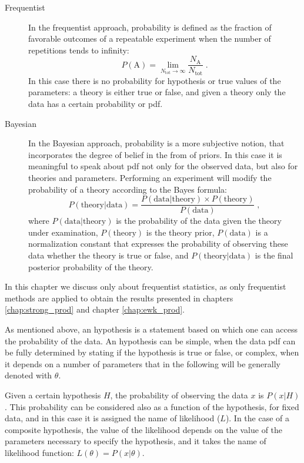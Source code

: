 \begin{description}
\item[Frequentist] In the frequentist approach, probability is defined as the fraction of favorable outcomes of a repeatable experiment when the number of repetitions tends to infinity:
\begin{equation}
P(\mathrm{A}) = \lim_{N_{\mathrm{tot}} \rightarrow \infty} \frac{N_\mathrm{A}}{N_{\mathrm{tot}}} \; .
\end{equation}
In this case there is no probability for hypothesis or true values of the parameters: a theory is either true or false, and given a theory only the data has a certain probability or \gls{pdf}.

\item[Bayesian] In the Bayesian approach, probability is a more subjective notion, that incorporates the degree of belief in the from of priors. In this case it is meaningful to speak about \gls{pdf} not only for the observed data, but also for theories and parameters. Performing an experiment will modify the probability of a theory according to the Bayes formula:
\begin{equation}
P(\mathrm{theory} | \mathrm{data}) = \frac{ P(\mathrm{data}|\mathrm{theory}) \times P(\mathrm{theory})}{P(\mathrm{data})} \; ,
\end{equation}
where $P(\mathrm{data}|\mathrm{theory})$ is the probability of the data given the theory under examination, $P(\mathrm{theory})$ is the theory prior, $P(\mathrm{data})$ is a normalization constant that expresses the probability of observing these data whether the theory is true or false, and $P(\mathrm{theory} | \mathrm{data})$ is the final posterior probability of the theory.

\end{description}

In this chapter we discuss only about frequentist statistics, as only frequentist methods are applied to obtain the results presented in chapters \ref{chap:strong_prod} and chapter \ref{chap:ewk_prod}. 

As mentioned above, an hypothesis is a statement based on which one can access the probability of the data. An hypothesis can be simple, when the data \gls{pdf} can be fully determined by stating if the hypothesis is true or false, or complex, when it depends on a number of parameters that in the following will be generally denoted with $\theta$. 

Given a certain hypothesis $H$, the probability of observing the data $x$ is $P(x|H)$. This probability can be considered also as a function of the hypothesis, for fixed data, and in this case it is assigned the name of likelihood ($L$). In the case of a composite hypothesis, the value of the likelihood depends on the value of the parameters necessary to specify the hypothesis, and it takes the name of likelihood function: $L(\theta)=P(x|\theta)$.

